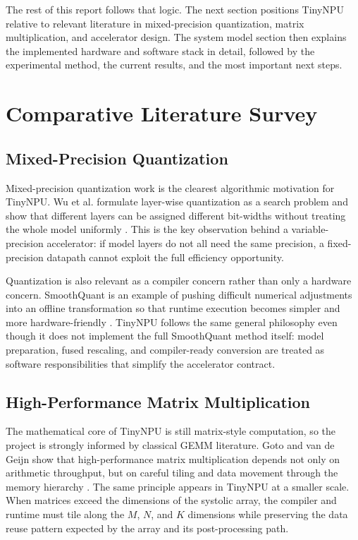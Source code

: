 \documentclass[a4paper, 12pt, titlepage]{article}
\begin{document}
The rest of this report follows that logic. The next section positions TinyNPU relative to relevant literature in mixed-precision quantization, matrix multiplication, and accelerator design. The system model section then explains the implemented hardware and software stack in detail, followed by the experimental method, the current results, and the most important next steps.
\newpage

\section{Comparative Literature Survey}
\subsection{Mixed-Precision Quantization}
Mixed-precision quantization work is the clearest algorithmic motivation for TinyNPU. Wu et al. formulate layer-wise quantization as a search problem and show that different layers can be assigned different bit-widths without treating the whole model uniformly \cite{wu2018mixedprecision}. This is the key observation behind a variable-precision accelerator: if model layers do not all need the same precision, a fixed-precision datapath cannot exploit the full efficiency opportunity.

Quantization is also relevant as a compiler concern rather than only a hardware concern. SmoothQuant is an example of pushing difficult numerical adjustments into an offline transformation so that runtime execution becomes simpler and more hardware-friendly \cite{xiao2023smoothquant}. TinyNPU follows the same general philosophy even though it does not implement the full SmoothQuant method itself: model preparation, fused rescaling, and compiler-ready conversion are treated as software responsibilities that simplify the accelerator contract.

\subsection{High-Performance Matrix Multiplication}
The mathematical core of TinyNPU is still matrix-style computation, so the project is strongly informed by classical GEMM literature. Goto and van de Geijn show that high-performance matrix multiplication depends not only on arithmetic throughput, but on careful tiling and data movement through the memory hierarchy \cite{goto2008anatomy}. The same principle appears in TinyNPU at a smaller scale. When matrices exceed the dimensions of the systolic array, the compiler and runtime must tile along the $M$, $N$, and $K$ dimensions while preserving the data reuse pattern expected by the array and its post-processing path.
\end{document}
